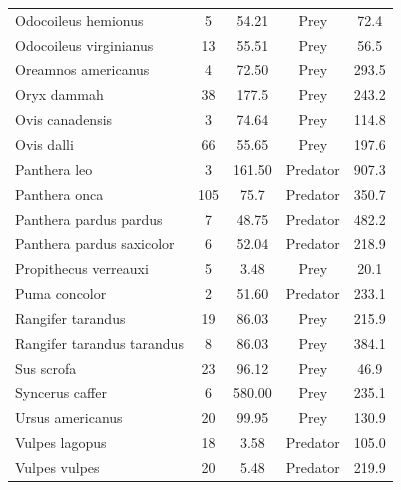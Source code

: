 \documentclass[12pt]{article}
\begin{document}
\begin{table}[!h]
\begin{center}
\begin{tabular}{lcccc}
Odocoileus hemionus               & 5          & 54.21         & Prey          & 72.4           \\
Odocoileus virginianus            & 13         & 55.51         & Prey          & 56.5           \\
Oreamnos americanus               & 4          & 72.50         & Prey          & 293.5          \\
Oryx dammah                       & 38         & 177.5         & Prey          & 243.2          \\
Ovis canadensis                   & 3          & 74.64         & Prey          & 114.8          \\
Ovis dalli                        & 66         & 55.65         & Prey          & 197.6          \\
Panthera leo                      & 3          & 161.50        & Predator      & 907.3          \\
Panthera onca                     & 105        & 75.7          & Predator      & 350.7          \\
Panthera pardus pardus            & 7          & 48.75         & Predator      & 482.2          \\
Panthera pardus saxicolor         & 6          & 52.04         & Predator      & 218.9          \\
Propithecus verreauxi             & 5          & 3.48          & Prey          & 20.1           \\
Puma concolor                     & 2          & 51.60         & Predator      & 233.1          \\
Rangifer tarandus                 & 19         & 86.03         & Prey          & 215.9          \\
Rangifer tarandus tarandus        & 8          & 86.03         & Prey          & 384.1          \\
Sus scrofa                        & 23         & 96.12         & Prey          & 46.9           \\
Syncerus caffer                   & 6          & 580.00        & Prey          & 235.1          \\
Ursus americanus                  & 20         & 99.95         & Prey          & 130.9          \\
Vulpes lagopus                    & 18         & 3.58          & Predator      & 105.0          \\
Vulpes vulpes                     & 20         & 5.48          & Predator      & 219.9          \\ \hline
\end{tabular}
\end{center}
\end{table}
\end{document}
